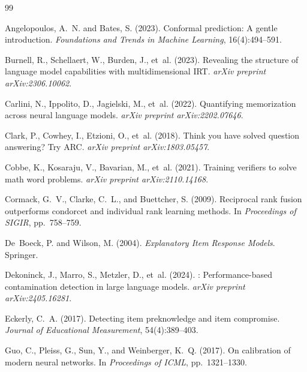 \documentclass[11pt]{article}
\begin{document}

\begin{thebibliography}{99}

Angelopoulos, A.~N. and Bates, S. (2023).
\newblock Conformal prediction: A gentle introduction.
\newblock \emph{Foundations and Trends in Machine Learning}, 16(4):494--591.

Burnell, R., Schellaert, W., Burden, J., et~al. (2023).
\newblock Revealing the structure of language model capabilities with multidimensional {IRT}.
\newblock \emph{arXiv preprint arXiv:2306.10062}.

Carlini, N., Ippolito, D., Jagielski, M., et~al. (2022).
\newblock Quantifying memorization across neural language models.
\newblock \emph{arXiv preprint arXiv:2202.07646}.

Clark, P., Cowhey, I., Etzioni, O., et~al. (2018).
\newblock Think you have solved question answering? {T}ry {ARC}.
\newblock \emph{arXiv preprint arXiv:1803.05457}.

Cobbe, K., Kosaraju, V., Bavarian, M., et~al. (2021).
\newblock Training verifiers to solve math word problems.
\newblock \emph{arXiv preprint arXiv:2110.14168}.

Cormack, G.~V., Clarke, C.~L., and Buettcher, S. (2009).
\newblock Reciprocal rank fusion outperforms condorcet and individual rank learning methods.
\newblock In \emph{Proceedings of SIGIR}, pp.~758--759.

De~Boeck, P. and Wilson, M. (2004).
\newblock \emph{Explanatory Item Response Models}.
\newblock Springer.

Dekoninck, J., Marro, S., Metzler, D., et~al. (2024).
: Performance-based contamination detection in large language models.
\newblock \emph{arXiv preprint arXiv:2405.16281}.

Eckerly, C.~A. (2017).
\newblock Detecting item preknowledge and item compromise.
\newblock \emph{Journal of Educational Measurement}, 54(4):389--403.

Guo, C., Pleiss, G., Sun, Y., and Weinberger, K.~Q. (2017).
\newblock On calibration of modern neural networks.
\newblock In \emph{Proceedings of ICML}, pp.~1321--1330.


\end{thebibliography}
\end{document}
